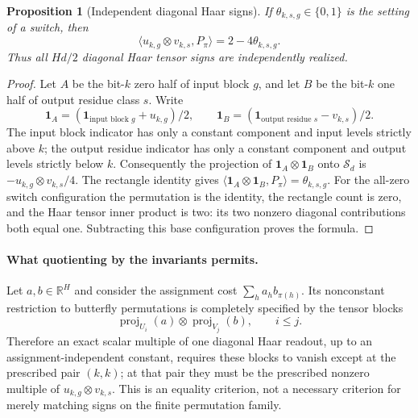 \documentclass[11pt]{article}
\newtheorem{proposition}{Proposition}
\begin{document}
\begin{proposition}[Independent diagonal Haar signs]
If $\theta_{k,s,g}\in\{0,1\}$ is the setting of a switch, then
\[
 \langle u_{k,g}\otimes v_{k,s},P_\pi\rangle
       =2-4\theta_{k,s,g}.
\]
Thus all $Hd/2$ diagonal Haar tensor signs are independently realized.
\end{proposition}
\begin{proof}
Let $A$ be the bit-$k$ zero half of input block $g$, and let $B$ be
the bit-$k$ one half of output residue class $s$. Write
\[
 \mathbf1_A=(\mathbf1_{\text{input block }g}+u_{k,g})/2,
 \qquad
 \mathbf1_B=(\mathbf1_{\text{output residue }s}-v_{k,s})/2.
\]
The input block indicator has only a constant component and input
levels strictly above $k$; the output residue indicator has only a
constant component and output levels strictly below $k$.
Consequently the projection of
$\mathbf1_A\otimes\mathbf1_B$ onto $\mathcal S_d$ is
$-u_{k,g}\otimes v_{k,s}/4$.
The rectangle identity gives
$\langle\mathbf1_A\otimes\mathbf1_B,P_\pi\rangle=\theta_{k,s,g}$.
For the all-zero switch configuration the permutation is the identity,
the rectangle count is zero, and the Haar tensor inner product is two:
its two nonzero diagonal contributions both equal one. Subtracting this
base configuration proves the formula.
\end{proof}

\paragraph{What quotienting by the invariants permits.}
Let $a,b\in\mathbb R^H$ and consider the assignment cost
$\sum_h a_h b_{\pi(h)}$.
Its nonconstant restriction to butterfly permutations is completely
specified by the tensor blocks
\[
 \operatorname{proj}_{U_i}(a)\otimes
 \operatorname{proj}_{V_j}(b),\qquad i\leq j.
\]
Therefore an exact scalar multiple of one diagonal Haar readout, up to
an assignment-independent constant, requires these blocks to vanish
except at the prescribed pair $(k,k)$; at that pair they must be the
prescribed nonzero multiple of $u_{k,g}\otimes v_{k,s}$.
This is an equality criterion, not a necessary criterion for merely
matching signs on the finite permutation family.
\end{document}

